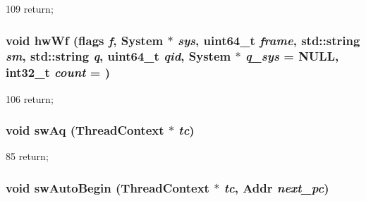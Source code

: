 \begin{DoxyCode}
109                                                                   { return; }
\end{DoxyCode}
\hypertarget{classCPA_a5f67bcd321d7d3535e71a61c71fbd304}{
\subsubsection[{hwWf}]{\setlength{\rightskip}{0pt plus 5cm}void hwWf ({\bf flags} {\em f}, \/  {\bf System} $\ast$ {\em sys}, \/  uint64\_\-t {\em frame}, \/  std::string {\em sm}, \/  std::string {\em q}, \/  uint64\_\-t {\em qid}, \/  {\bf System} $\ast$ {\em q\_\-sys} = {\ttfamily NULL}, \/  int32\_\-t {\em count} = {})}}
\label{classCPA_a5f67bcd321d7d3535e71a61c71fbd304}



\begin{DoxyCode}
106                                                                   { return; }
\end{DoxyCode}
\hypertarget{classCPA_ae25580c3c1a90a6979ca6ef3c737f91b}{
\subsubsection[{swAq}]{\setlength{\rightskip}{0pt plus 5cm}void swAq ({\bf ThreadContext} $\ast$ {\em tc})}}
\label{classCPA_ae25580c3c1a90a6979ca6ef3c737f91b}



\begin{DoxyCode}
85 { return; }
\end{DoxyCode}
\hypertarget{classCPA_aa8ccd90dbd2c58f74d1b0bdc10690c98}{
\subsubsection[{swAutoBegin}]{\setlength{\rightskip}{0pt plus 5cm}void swAutoBegin ({\bf ThreadContext} $\ast$ {\em tc}, \/  {\bf Addr} {\em next\_\-pc})}}
\label{classCPA_aa8ccd90dbd2c58f74d1b0bdc10690c98}



